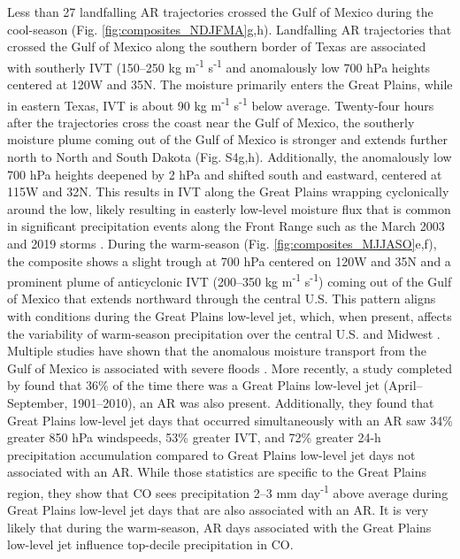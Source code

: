 \documentclass[draft]{agujournal2019}
\begin{document}
Less than 27 landfalling AR trajectories crossed the Gulf of Mexico during the cool-season (Fig. \ref{fig:composites_NDJFMA}g,h). Landfalling AR trajectories that crossed the Gulf of Mexico along the southern border of Texas are associated with southerly IVT (150--250 kg m\textsuperscript{-1} s\textsuperscript{-1} and anomalously low 700 hPa heights centered at 120\textdegree W and 35\textdegree N. The moisture primarily enters the Great Plains, while in eastern Texas, IVT is about 90 kg m\textsuperscript{-1} s\textsuperscript{-1} below average. Twenty-four hours after the trajectories cross the coast near the Gulf of Mexico, the southerly moisture plume coming out of the Gulf of Mexico is stronger and extends further north to North and South Dakota (Fig. S4g,h). Additionally, the anomalously low 700 hPa heights deepened by 2 hPa and shifted south and eastward, centered at 115\textdegree W and 32\textdegree N. This results in IVT along the Great Plains wrapping cyclonically around the low, likely resulting in easterly low-level moisture flux that is common in significant precipitation events along the Front Range such as the March 2003 and 2019 storms \cite{Wesley2013Extreme2003, Zou2024A2019}. During the warm-season (Fig. \ref{fig:composites_MJJASO}e,f), the composite shows a slight trough at 700 hPa centered on 120\textdegree W and 35\textdegree N and a prominent plume of anticyclonic IVT (200--350 kg m\textsuperscript{-1} s\textsuperscript{-1}) coming out of the Gulf of Mexico that extends northward through the central U.S. This pattern aligns with conditions during the Great Plains low-level jet, which, when present, affects the variability of warm-season precipitation over the central U.S. and Midwest \cite{Pu2016DynamicalPrecipitation, Helfand1995ClimatologyStates, Weaver2008VariabilityImpacts, Schubert1998SubseasonalStates}. Multiple studies have shown that the anomalous moisture transport from the Gulf of Mexico is associated with severe floods \cite{Mo1997AtmosphericStates, Weaver2009PentadBalance}. More recently, a study completed by  found that 36\% of the time there was a Great Plains low-level jet (April--September, 1901--2010), an AR was also present. Additionally, they found that Great Plains low-level jet days that occurred simultaneously with an AR saw 34\% greater 850 hPa windspeeds, 53\% greater IVT, and 72\% greater 24-h precipitation accumulation compared to Great Plains low-level jet days not associated with an AR. While those statistics are specific to the Great Plains region, they show that CO sees precipitation 2--3 mm day\textsuperscript{-1} above average during Great Plains low-level jet days that are also associated with an AR. It is very likely that during the warm-season, AR days associated with the Great Plains low-level jet influence top-decile precipitation in CO. 
\end{document}

